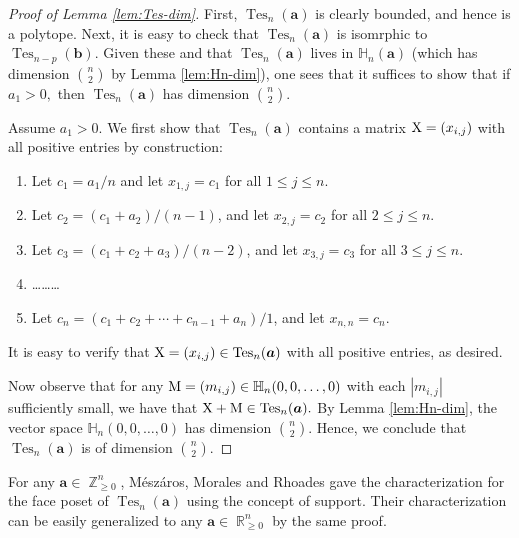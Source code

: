 \documentclass[12pt]{amsart}
\numberwithin{equation}{section}
\theoremstyle{definition}
\def\tes{\operatorname{Tes}}
\def\ba{{\boldsymbol{a}}}
\def\bb{{\boldsymbol{b}}}
\def\MM{{\rm{M}}}
\def\XX{{\rm{X}}}
\def\Z{\operatorname{\mathbb{Z}}}
\def\R{\operatorname{\mathbb{R}}}
\def\H{\mathbb{H}}
\begin{document}
\begin{proof}[Proof of Lemma \ref{lem:Tes-dim}]
  First, $\tes_n(\ba)$ is clearly bounded, and hence is a polytope. Next, it is easy to check that $\tes_n(\ba)$ is isomrphic to $\tes_{n-p}(\bb).$ Given these and that $\tes_n(\ba)$ lives in $\H_n(\ba)$ (which has dimension $\binom{n}{2}$ by Lemma \ref{lem:Hn-dim}), one sees that it suffices to show that if $a_1 > 0,$ then $\tes_n(\ba)$ has dimension $\binom{n}{2}.$

  
  Assume $a_1 > 0$. We first show that $\tes_n(\ba)$ contains a matrix $\XX=(x_{i,j})$ with all positive entries by construction: 
  \begin{enumerate}
    \item Let $c_1 = a_1/n$ and let $x_{1,j} = c_1$ for all $1 \le j \le n.$
    \item Let $c_2 = (c_1 + a_2)/(n-1)$, and let $x_{2,j} = c_2$ for all $2 \le j \le n.$
    \item Let $c_3 = (c_1+c_2+a_3)/(n-2)$, and let $x_{3,j} = c_3$ for all $3 \le j \le n.$
    \item[(\dots)] \dots \dots \dots
    \item[(n)] Let $c_n = (c_1+c_2 + \cdots + c_{n-1} + a_n)/1$, and let $x_{n,n} = c_n.$
  \end{enumerate}
  It is easy to verify that $\XX=(x_{i,j}) \in \tes_n(\ba)$ with all positive entries, as desired. 

  Now observe that for any $\MM=(m_{i,j}) \in \H_n(0,0,\dots,0)$ with each $|m_{i,j}|$ sufficiently small, we have that $\XX + \MM \in \tes_n(\ba).$ By Lemma \ref{lem:Hn-dim}, the vector space $\H_n(0,0,\dots,0)$ has dimension $\binom{n}{2}.$ Hence, we conclude that $\tes_n(\ba)$ is of dimension $\binom{n}{2}.$
\end{proof}



For any $\ba \in \Z_{\geq 0}^n$, M\'{e}sz\'{a}ros, Morales and Rhoades \cite{Meszaros2017} gave the characterization for the face poset of $\tes_{n}(\ba)$ using the concept of support. 
Their characterization can be easily generalized to any $\ba \in \R_{\geq 0}^{n}$ by the same proof.
\end{document}
